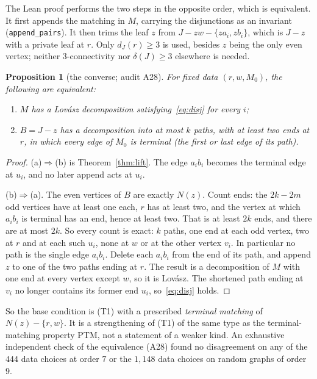 \documentclass[11pt]{amsart}
\newtheorem{proposition}[theorem]{Proposition}
\theoremstyle{definition}
\begin{document}
The Lean proof performs the two steps in the opposite order, which is equivalent. It first appends the
matching in $M$, carrying the disjunctions as an invariant (\texttt{append\_pairs}). It then trims the
leaf $z$ from $J-zw-\{za_i,zb_i\}$, which is $J-z$ with a private leaf at $r$. Only $d_J(r)\ge3$ is
used, besides $z$ being the only even vertex; neither $3$-connectivity nor $\delta(J)\ge 3$ elsewhere is
needed.

\begin{proposition}[the converse; audit A28]\label{prop:converse}
For fixed data $(r,w,M_0)$, the following are equivalent:
\begin{enumerate}[label=(\alph*)]
\item $M$ has a Lov\'asz decomposition satisfying~\eqref{eq:disj} for every $i$;
\item $B=J-z$ has a decomposition into at most $k$ paths, with at least two ends at $r$, in which
every edge of $M_0$ is terminal (the first or last edge of its path).
\end{enumerate}
\end{proposition}

\begin{proof}
(a)$\Rightarrow$(b) is Theorem~\ref{thm:lift}. The edge $a_ib_i$ becomes the terminal edge at $u_i$, and
no later append acts at $u_i$.

(b)$\Rightarrow$(a). The even vertices of $B$ are exactly $N(z)$. Count ends: the $2k-2m$ odd vertices
have at least one each, $r$ has at least two, and the vertex at which $a_ib_i$ is terminal has an end,
hence at least two. That is at least $2k$ ends, and there are at most $2k$. So every count is exact:
$k$ paths, one end at each odd vertex, two at $r$ and at each such $u_i$, none at $w$ or at the other
vertex $v_i$. In particular no path is the single edge $a_ib_i$. Delete each $a_ib_i$ from the end of
its path, and append $z$ to one of the two paths ending at $r$. The result is a decomposition of $M$
with one end at every vertex except $w$, so it is Lov\'asz. The shortened path ending at $v_i$ no longer
contains its former end $u_i$, so~\eqref{eq:disj} holds.
\end{proof}

So the base condition is (T1) with a prescribed \emph{terminal matching} of $N(z)-\{r,w\}$. It is a
strengthening of (T1) of the same type as the terminal-matching property PTM, not a statement of a
weaker kind. An exhaustive independent check of the equivalence (A28) found no disagreement on any of
the $444$ data choices at order $7$ or the $1{,}148$ data choices on random graphs of order $9$.
\end{document}
